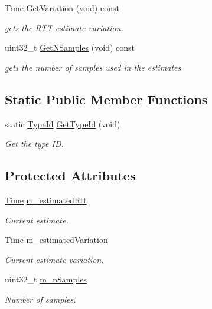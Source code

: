 \begin{DoxyCompactItemize}
\hyperlink{classns3_1_1Time}{Time} \hyperlink{classns3_1_1RttEstimator_a48b42289cba668b30d69bfe384d37d25}{Get\+Variation} (void) const 
\begin{DoxyCompactList}\small\item\em gets the R\+TT estimate variation. \end{DoxyCompactList}\item 
uint32\+\_\+t \hyperlink{classns3_1_1RttEstimator_a56d664ff2d402087e6eaccada7eee6af}{Get\+N\+Samples} (void) const 
\begin{DoxyCompactList}\small\item\em gets the number of samples used in the estimates \end{DoxyCompactList}\end{DoxyCompactItemize}
\subsection*{Static Public Member Functions}
\begin{DoxyCompactItemize}
\item 
static \hyperlink{classns3_1_1TypeId}{Type\+Id} \hyperlink{classns3_1_1RttEstimator_ad07777f199907e2a96d2cd5cb8539cbc}{Get\+Type\+Id} (void)
\begin{DoxyCompactList}\small\item\em Get the type ID. \end{DoxyCompactList}\end{DoxyCompactItemize}
\subsection*{Protected Attributes}
\begin{DoxyCompactItemize}
\item 
\hyperlink{classns3_1_1Time}{Time} \hyperlink{classns3_1_1RttEstimator_ac39ddf21dd9bd99416704b83650d2812}{m\+\_\+estimated\+Rtt}
\begin{DoxyCompactList}\small\item\em Current estimate. \end{DoxyCompactList}\item 
\hyperlink{classns3_1_1Time}{Time} \hyperlink{classns3_1_1RttEstimator_a5519242fbbbf189c996e7fd7da2d7085}{m\+\_\+estimated\+Variation}
\begin{DoxyCompactList}\small\item\em Current estimate variation. \end{DoxyCompactList}\item 
uint32\+\_\+t \hyperlink{classns3_1_1RttEstimator_a6a70cc48220dae4db259cb5cfee86cf5}{m\+\_\+n\+Samples}
\begin{DoxyCompactList}\small\item\em Number of samples. \end{DoxyCompactList}\end{DoxyCompactItemize}
